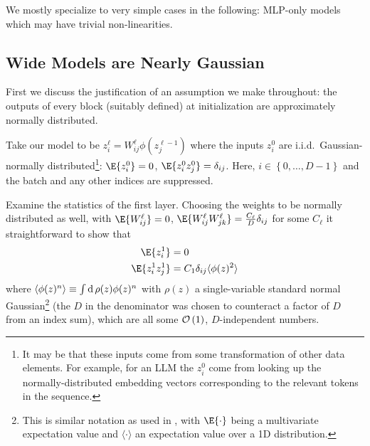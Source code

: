\documentclass[11pt]{article}
\begin{document}
We mostly specialize to very simple cases in the following: MLP-only models which may have trivial
non-linearities.


\subsection{Wide Models are Nearly Gaussian \label{app_nearly_gaussian_wide_models}}

First we discuss the justification of an assumption we make throughout: the outputs of every block
(suitably defined) at initialization are approximately normally distributed.

Take our model to be $ z ^{ \ell } _{ i } = W ^{  \ell }_{ ij } \phi \left ( z ^{ \ell -1 } _{ j }
\right ) $ where the inputs $ z ^{ 0 } _{ i } $ are i.i.d.~Gaussian-normally
distributed\footnote{It may be that these inputs come from some transformation of other data
    elements. For example, for an LLM the $ z ^{ 0 }_{ i } $ come from looking up the
    normally-distributed embedding vectors corresponding to the relevant tokens in the
sequence.}: $ \E{ z^{ 0 }_{ i }} = 0 $,  $ \E{ z ^{ 0 }_{ i }z ^{ 0 }_{ j }}
=  \delta _{ ij } $. Here, $ i \in \left \{ 0, \ldots , D-1 \right \} $ and the batch and any
other indices are suppressed.

Examine the statistics of the first layer. Choosing the weights to be normally distributed as well,
with $ \E{ W^{ \ell }_{ ij }} = 0 $,  $ \E{ W ^{ \ell }_{ ij }W ^{ \ell }_{ jk
}} = \frac{ C _{ \ell } }{ D } \delta _{ ij }$ for some $ C _{  \ell } $ it straightforward to
show that
\begin{align}
    \E{ z^{ 1 }_{ i }} &= 0 \nn
    \E{ z^{ 1 }_{ i }z^{ 1 }_{ j }} &= C _{ 1 }\delta _{ ij } \langle \phi(z )^{ 2 }\rangle
\end{align}
where  $ \langle \phi(z)^{ n }\rangle \equiv  \int  {\rm d}\, \rho(z) \phi(z)^{ n } $ with
$ \rho(z) $ a single-variable standard normal Gaussian\footnote{This is similar notation as used in
\cite{physicalDL}, with $ \E{\cdot} $ being a multivariate expectation value and $ \langle \cdot
\rangle  $ an expectation value over a 1D distribution.} (the $ D $ in the denominator was chosen to
counteract a factor of $ D $ from an index sum), which are all some $ \mathcal{O} \left( 1 \right)  $, $ D
$-independent numbers.
\end{document}
